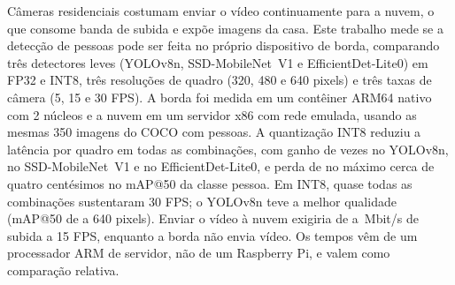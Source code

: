 Câmeras residenciais costumam enviar o vídeo continuamente para a nuvem, o que consome banda de subida e expõe imagens da casa. Este trabalho mede se a detecção de pessoas pode ser feita no próprio dispositivo de borda, comparando três detectores leves (YOLOv8n, SSD-MobileNet~V1 e EfficientDet-Lite0) em FP32 e INT8, três resoluções de quadro (320, 480 e 640 pixels) e três taxas de câmera (5, 15 e 30 FPS). A borda foi medida em um contêiner ARM64 nativo com 2 núcleos e a nuvem em um servidor x86 com rede emulada, usando as mesmas 350 imagens do COCO com pessoas. A quantização INT8 reduziu a latência por quadro em todas as \nCombBorda{} combinações, com ganho de \razaoYoloTres{} vezes no YOLOv8n, \razaoSsdTres{} no SSD-MobileNet~V1 e \razaoEffdetTres{} no EfficientDet-Lite0, e perda de no máximo cerca de quatro centésimos no mAP@50 da classe pessoa. Em INT8, quase todas as combinações sustentaram 30 FPS; o YOLOv8n teve a melhor qualidade (mAP@50 de \mapYoloFpSeis{} a 640 pixels). Enviar o vídeo à nuvem exigiria de \bandaTresQuinze{} a \bandaSeisQuinze{}\,Mbit/s de subida a 15 FPS, enquanto a borda não envia vídeo. Os tempos vêm de um processador ARM de servidor, não de um Raspberry Pi, e valem como comparação relativa.
